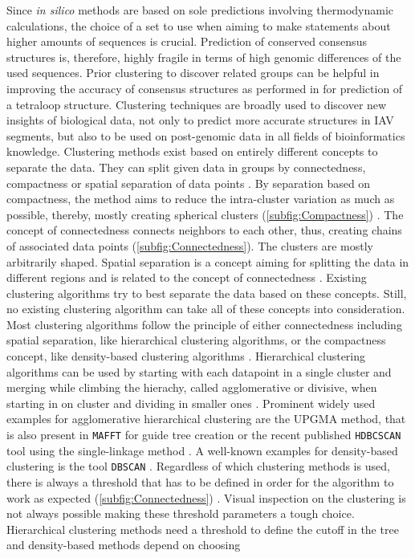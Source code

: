 \vspace{1em}

Since \textit{in silico} methods are based on sole predictions involving thermodynamic calculations, the choice of a set to use when aiming to make statements about higher amounts of sequences is crucial. Prediction of conserved consensus structures is, therefore, highly fragile in terms of high genomic differences of the used sequences. Prior clustering to discover related groups can be helpful in improving the accuracy of consensus structures as performed in \textcite{moss_identification_2011} for prediction of a tetraloop structure. Clustering techniques are broadly used to discover new insights of biological data, not only to predict more accurate structures in \gls{IAV} segments, but also to be used on post-genomic data in all fields of bioinformatics knowledge\autocite{handl_computational_2005}. Clustering methods exist based on entirely different concepts to separate the data. They can split given data in groups by connectedness, compactness or spatial separation of data points \autocite{handl_computational_2005}. By separation based on compactness, the method aims to reduce the intra-cluster variation as much as possible, thereby, mostly creating spherical clusters (\autoref{subfig:Compactness}) \autocite{handl_computational_2005}. The concept of connectedness connects neighbors to each other, thus, creating chains of associated data points (\autoref{subfig:Connectedness}). The clusters are mostly arbitrarily shaped. Spatial separation is a concept aiming for splitting the data in different regions and is related to the concept of connectedness \autocite{handl_computational_2005}. Existing clustering algorithms try to best separate the data based on these concepts. Still, no existing clustering algorithm can take all of these concepts into consideration. Most clustering algorithms follow the principle of either connectedness including spatial separation, like hierarchical clustering algorithms, or the compactness concept, like density-based clustering algorithms \autocite{handl_computational_2005}. Hierarchical clustering algorithms can be used by starting with each datapoint in a single cluster and merging while climbing the hierachy, called agglomerative or divisive, when starting in on cluster and dividing in smaller ones \autocite{murtagh_algorithms_2012}. Prominent widely used examples for agglomerative hierarchical clustering are the \gls{UPGMA} method, that is also present in \texttt{MAFFT} for guide tree creation or the recent published \texttt{HDBCSCAN} tool using the single-linkage  method \autocite{katoh_mafft_2002, mcinnes_hdbscan_2017}. A well-known examples for density-based clustering is the tool \texttt{DBSCAN} \autocite{madhulatha_overview_2012, schubert_dbscan_2017}. Regardless of which clustering methods is used, there is always a threshold that has to be defined in order for the algorithm to work as expected (\autoref{subfig:Connectedness}) \autocite{madhulatha_overview_2012}. Visual inspection on the clustering is not always possible making these threshold parameters a tough choice. Hierarchical clustering methods need a threshold to define the cutoff in the tree and density-based methods depend on choosing 